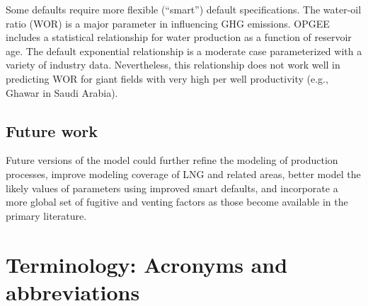 \documentclass[11pt]{report}
\begin{document}
Some defaults require more flexible (``smart'') default specifications. The water-oil ratio (WOR) is a major parameter in influencing GHG emissions. OPGEE includes a statistical relationship for water production as a function of reservoir age. The default exponential relationship is a moderate case parameterized with a variety of industry data. Nevertheless, this relationship does not work well in predicting WOR for giant fields with very high per well productivity (e.g., Ghawar in Saudi Arabia). \par




\section{Future work}

Future versions of the model could further refine the modeling of production processes, improve modeling coverage of LNG and related areas, better model the likely values of parameters using improved smart defaults, and incorporate a more global set of fugitive and venting factors as those become available in the primary literature.






\appendix


















\chapter{Terminology: Acronyms and abbreviations}
\end{document}
